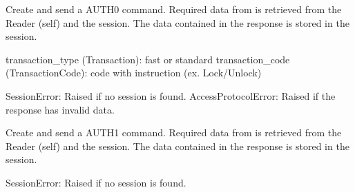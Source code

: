 \documentclass[letterpaper,10pt,english]{sphinxmanual}
\begin{document}
\begin{fulllineitems}
\begin{fulllineitems}
\label{\detokenize{aliro_actuator.access_protocol.reader:aliro_actuator.access_protocol.reader.Reader.handle_auth0}}
\pysigstartsignatures
{}
\pysigstopsignatures
\sphinxAtStartPar
Create and send a AUTH0 command.
Required data from is retrieved from the Reader (self) and the session.
The data contained in the response is stored in the session.
\begin{description}
\sphinxAtStartPar
transaction\_type (Transaction): fast or standard
transaction\_code (TransactionCode): code with instruction (ex. Lock/Unlock)

\sphinxAtStartPar
SessionError: Raised if no session is found.
AccessProtocolError: Raised if the response has invalid data.

\end{description}

\end{fulllineitems}


\begin{fulllineitems}
\label{\detokenize{aliro_actuator.access_protocol.reader:aliro_actuator.access_protocol.reader.Reader.handle_auth1}}
\pysigstartsignatures
{}
\pysigstopsignatures
\sphinxAtStartPar
Create and send a AUTH1 command.
Required data from is retrieved from the Reader (self) and the session.
The data contained in the response is stored in the session.
\begin{description}
\sphinxAtStartPar
SessionError: Raised if no session is found.


\end{description}
\end{fulllineitems}
\end{fulllineitems}
\end{document}
